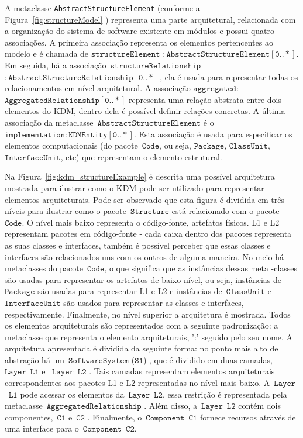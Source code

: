 A metaclasse \texttt{AbstractStructureElement} (conforme a Figura~\ref{fig:structureModel} ) representa uma parte arquitetural, relacionada com a organização do sistema de software existente em módulos e possui quatro associações. A primeira associação representa os elementos pertencentes ao modelo e é chamada de $\mathtt{structureElement}$ $\mathtt{:AbstractStructureElement[0..*]}$. Em seguida, há a associação~$\mathtt{structureRelationship}$ $\mathtt{:AbstractStructureRelationship[0..*]}$, ela é usada para representar todas os relacionamentos em nível arquitetural. A associação $\mathtt{aggregated:}$ $\mathtt{AggregatedRelationship[0..*]}$ representa uma relação abstrata entre dois elementos do KDM, dentro dela é possível definir relações concretas. A última associação da metaclasse~$\mathtt{AbstractStructureElement}$ é o~$\mathtt{implementation:KDMEntity[0..*]}$. Esta associação é usada para especificar os elementos computacionais (do pacote~$\mathtt{Code}$, ou seja, $\mathtt{Package}$, $\mathtt{ClassUnit}$, $\mathtt{InterfaceUnit}$, etc) que representam o elemento estrutural. 

Na Figura~\ref{fig:kdm_structureExample} é descrita uma possível arquitetura mostrada para ilustrar como o KDM pode ser utilizado para representar elementos arquiteturais. Pode ser observado que esta figura é dividida em três níveis para ilustrar como o pacote~$\mathtt{Structure}$ está relacionado com o pacote~$\mathtt{Code}$. O nível mais baixo representa o código-fonte, artefatos físicos. L1 e L2 representam pacotes em código-fonte - cada caixa dentro dos pacotes representa as suas classes e interfaces, também é possível perceber que essas classes e interfaces são relacionados uns com os outros de alguma maneira. No meio há metaclasses do pacote~$\mathtt{Code}$, o que significa que as instâncias dessas meta -classes são usadas para representar os artefatos de baixo nível, ou seja, instâncias de~$\mathtt{Package}$ são usadas para representar L1 e L2 e instâncias de~$\mathtt{ClassUnit}$ e~$\mathtt{InterfaceUnit}$ são usados para representar as classes e interfaces, respectivamente. Finalmente, no nível superior a arquitetura é mostrada. Todos os elementos arquiteturais são representados com a seguinte padronização: a metaclasse que representa o elemento arquiteturais, ':' seguido pelo seu nome. A arquitetura apresentada é dividida da seguinte forma: no ponto mais alto de abstração há um~$\mathtt{SoftwareSystem}$ ($\mathtt{S1}$) , que é dividido em duas camadas, ~$\mathtt{Layer}$~$\mathtt{L1}$  e ~$\mathtt{Layer}$~$\mathtt{L2}$ . Tais camadas representam elementos arquiteturais correspondentes aos pacotes L1 e L2 representadas no nível mais baixo. A~$\mathtt{Layer}$~$\mathtt{L1}$ pode acessar os elementos da~$\mathtt{Layer}$~$\mathtt{L2}$, essa restrição  é representada pela metaclasse~$\mathtt{AggregatedRelationship}$ . Além disso, a~$\mathtt{Layer}$~$\mathtt{L2}$ contém dois componentes,~$\mathtt{C1}$  e~$\mathtt{C2}$ . Finalmente, o~$\mathtt{Component}$~$\mathtt{C1}$ fornece recursos através de uma interface para o~$\mathtt{Component}$~$\mathtt{C2}$.

